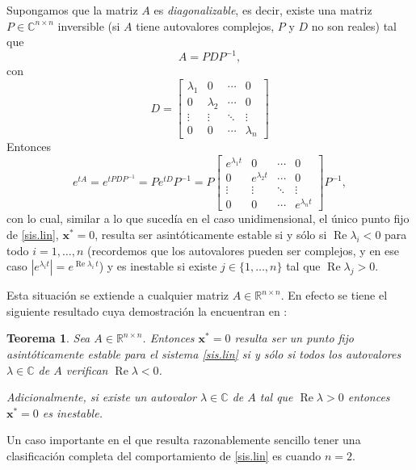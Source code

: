 \documentclass[12pt, a4paper]{amsbook}
\renewcommand{\Re}{\operatorname{Re}}
\newcommand{\R}{{\mathbb R}}
\newcommand{\C}{{\mathbb C}}
\newcommand{\xx}{{\mathbf x}}
\newtheorem{teo}{Teorema}[section]
\theoremstyle{remark}
\theoremstyle{definition}
\numberwithin{section}{chapter}
\numberwithin{subsection}{section}
\numberwithin{equation}{section}
\numberwithin{figure}{chapter}
\begin{document}
Supongamos que la matriz $A$ es {\em diagonalizable}, es decir, existe una matriz $P\in\C^{n\times n}$ inversible (si $A$ tiene autovalores complejos, $P$ y $D$ no son reales) tal que
$$
A = PDP^{-1},
$$
con 
$$
D = \begin{bmatrix}
\lambda_1 & 0 & \cdots & 0\\
0 & \lambda_2 & \cdots & 0\\
\vdots & \vdots & \ddots & \vdots\\
0 & 0 & \cdots & \lambda_n
\end{bmatrix}
$$
Entonces 
$$
e^{tA} = e^{tPDP^{-1}} = Pe^{tD}P^{-1} = P\begin{bmatrix}
e^{\lambda_1 t} & 0 & \cdots & 0\\
0 & e^{\lambda_2 t} & \cdots & 0\\
\vdots & \vdots & \ddots & \vdots\\
0 & 0 & \cdots & e^{\lambda_n t}
\end{bmatrix}P^{-1},
$$
con lo cual, similar a lo que sucedía en el caso unidimensional, el único punto fijo de \eqref{sis.lin}, $\xx^*=0$, resulta ser asintóticamente estable si y sólo si $\Re\lambda_i<0$ para todo $i=1,\dots, n$ (recordemos que los autovalores pueden ser complejos, y en ese caso $|e^{\lambda_i t}| = e^{\Re\lambda_i\, t}$) y es inestable si existe $j\in \{1,\dots,n\}$ tal que $\Re\lambda_j>0$.

Esta situación se extiende a cualquier matriz $A\in\R^{n\times n}$. En efecto se tiene el siguiente resultado cuya demostración la encuentran en \cite{Coddington}:
\begin{teo}
Sea $A\in \R^{n\times n}$. Entonces $\xx^*=0$ resulta ser un punto fijo asintóticamente estable para el sistema \eqref{sis.lin} si y sólo si todos los autovalores $\lambda\in \C$ de $A$ verifican $\Re\lambda<0$. 

Adicionalmente, si existe un autovalor $\lambda\in\C$ de $A$ tal que $\Re \lambda>0$ entonces $\xx^*=0$ es inestable.
\end{teo}

Un caso importante en el que resulta razonablemente sencillo tener una clasificación completa del comportamiento de \eqref{sis.lin} es cuando $n=2$.
\end{document}
